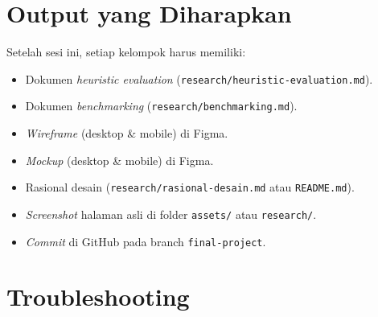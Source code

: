\section{Output yang Diharapkan}
\label{sec:output-minggu-14}

Setelah sesi ini, setiap kelompok harus memiliki:
\begin{itemize}
  \item Dokumen \emph{heuristic evaluation} (\texttt{research/heuristic-evaluation.md}).
  \item Dokumen \emph{benchmarking} (\texttt{research/benchmarking.md}).
  \item \emph{Wireframe} (desktop \& mobile) di Figma.
  \item \emph{Mockup} (desktop \& mobile) di Figma.
  \item Rasional desain (\texttt{research/rasional-desain.md} atau \texttt{README.md}).
  \item \emph{Screenshot} halaman asli di folder \texttt{assets/} atau \texttt{research/}.
  \item \emph{Commit} di GitHub pada branch \texttt{final-project}.
\end{itemize}

\section{Troubleshooting}
\label{sec:troubleshooting-minggu-14}

